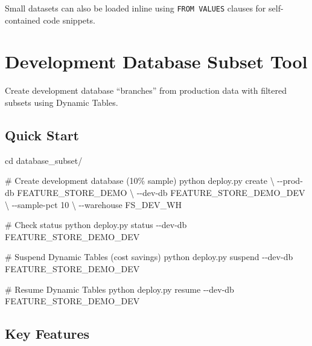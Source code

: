 \documentclass[
  letterpaper,
  DIV=11,
  numbers=noendperiod]{scrreprt}
\newenvironment{Shaded}{\begin{snugshade}}{\end{snugshade}}
\newcommand{\AttributeTok}[1]{\textcolor[rgb]{0.40,0.45,0.13}{#1}}
\newcommand{\BuiltInTok}[1]{\textcolor[rgb]{0.00,0.23,0.31}{#1}}
\newcommand{\CommentTok}[1]{\textcolor[rgb]{0.37,0.37,0.37}{#1}}
\newcommand{\DataTypeTok}[1]{\textcolor[rgb]{0.68,0.00,0.00}{#1}}
\newcommand{\ExtensionTok}[1]{\textcolor[rgb]{0.00,0.23,0.31}{#1}}
\newcommand{\NormalTok}[1]{\textcolor[rgb]{0.00,0.23,0.31}{#1}}
\begin{document}
Small datasets can also be loaded inline using \texttt{FROM\ VALUES}
clauses for self-contained code snippets.

\hypertarget{development-database-subset-tool}{%
\section{Development Database Subset
Tool}\label{development-database-subset-tool}}

Create development database ``branches'' from production data with
filtered subsets using Dynamic Tables.

\hypertarget{quick-start-2}{%
\subsection{Quick Start}\label{quick-start-2}}

\begin{Shaded}
\begin{Highlighting}[]
\BuiltInTok{cd}\NormalTok{ database\_subset/}

\CommentTok{\# Create development database (10\% sample)}
\ExtensionTok{python}\NormalTok{ deploy.py create }\DataTypeTok{\textbackslash{}}
    \AttributeTok{{-}{-}prod{-}db}\NormalTok{ FEATURE\_STORE\_DEMO }\DataTypeTok{\textbackslash{}}
    \AttributeTok{{-}{-}dev{-}db}\NormalTok{ FEATURE\_STORE\_DEMO\_DEV }\DataTypeTok{\textbackslash{}}
    \AttributeTok{{-}{-}sample{-}pct}\NormalTok{ 10 }\DataTypeTok{\textbackslash{}}
    \AttributeTok{{-}{-}warehouse}\NormalTok{ FS\_DEV\_WH}

\CommentTok{\# Check status}
\ExtensionTok{python}\NormalTok{ deploy.py status }\AttributeTok{{-}{-}dev{-}db}\NormalTok{ FEATURE\_STORE\_DEMO\_DEV}

\CommentTok{\# Suspend Dynamic Tables (cost savings)}
\ExtensionTok{python}\NormalTok{ deploy.py suspend }\AttributeTok{{-}{-}dev{-}db}\NormalTok{ FEATURE\_STORE\_DEMO\_DEV}

\CommentTok{\# Resume Dynamic Tables}
\ExtensionTok{python}\NormalTok{ deploy.py resume }\AttributeTok{{-}{-}dev{-}db}\NormalTok{ FEATURE\_STORE\_DEMO\_DEV}
\end{Highlighting}
\end{Shaded}

\hypertarget{key-features}{%
\subsection{Key Features}\label{key-features}}
\end{document}
